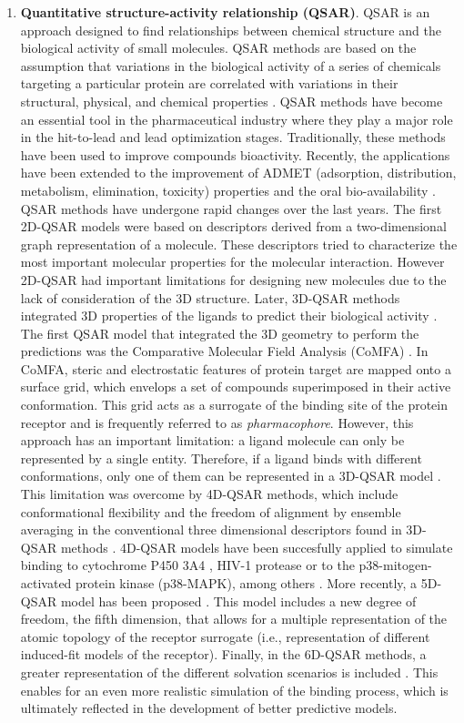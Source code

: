 \documentclass[11pt, b5paper,twoside]{tesi_upf}
\begin{document}
{\begin{enumerate}
\item \textbf{Quantitative structure-activity relationship (QSAR)}\label{qsar}. QSAR is an approach designed to find relationships between chemical structure and the biological activity of small molecules. QSAR methods are based on the assumption that variations in the biological  activity  of  a  series  of  chemicals  targeting a particular protein are correlated  with variations in their structural, physical, and chemical properties \cite{Perkins2003}. QSAR methods have become an essential tool in the pharmaceutical industry where they play a major role in the hit-to-lead and lead optimization stages. Traditionally, these methods have been used to improve compounds bioactivity. Recently, the applications have been extended to the improvement of ADMET (adsorption, distribution, metabolism, elimination, toxicity) properties \cite{Penzotti2004, Obrezanova2007} and the oral bio-availability \cite{Yoshida2000}. QSAR  methods have undergone rapid changes over the last years. The first 2D-QSAR models were based on descriptors derived from a two-dimensional graph representation of a molecule. These descriptors tried to characterize the most important molecular properties for the molecular interaction. However 2D-QSAR had important limitations for designing new molecules due to the lack of consideration of the 3D structure. Later, 3D-QSAR methods integrated 3D properties of the ligands to predict their biological activity \cite{Verma2010}. The first QSAR model that integrated the 3D geometry to perform the predictions was the Comparative Molecular Field Analysis (CoMFA) \cite{Cramer1988}. In CoMFA, steric and electrostatic features of protein target are mapped onto a surface grid, which envelops a set of compounds superimposed in their active conformation. This grid acts as a surrogate of the binding site of the protein receptor and is frequently referred to as \textit{pharmacophore}. However, this approach has an important limitation: a ligand molecule can only be represented by a single entity. Therefore, if a ligand binds with different conformations, only one of them can be represented in a 3D-QSAR model \cite{Verma2010}. This limitation was overcome by 4D-QSAR methods, which include conformational flexibility and the freedom of alignment by ensemble averaging in the conventional three dimensional descriptors found in 3D-QSAR methods \cite{Hopfinger1997}. 4D-QSAR models have been succesfully applied to simulate binding to cytochrome P450 3A4 \cite{Ekins2000}, HIV-1 protease \cite{Iyer2007} or to the p38-mitogen-activated protein kinase (p38-MAPK), \cite{Romeiro2010} among others \cite{Andrade2010}. More recently, a 5D-QSAR model has been proposed \cite{Vedani2002}. This model includes a new degree of freedom, the fifth dimension, that allows for a multiple representation of the atomic topology of the receptor surrogate (i.e., representation of different induced-fit models of the receptor). Finally, in the 6D-QSAR methods, a greater representation of the different solvation scenarios is included \cite{Vedani2005}. This enables for an even more realistic simulation of the binding process, which is ultimately reflected in the development of better predictive models.   

\end{enumerate}}
\end{document}
